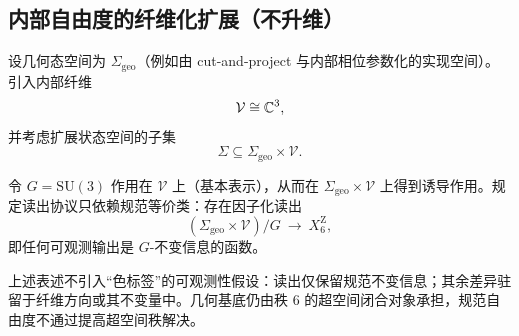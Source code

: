 \subsection{内部自由度的纤维化扩展（不升维）}
\begin{definition}[状态空间的纤维化扩展]\label{def:sigma-geo-times-V}
设几何态空间为 $\Sigma_{\mathrm{geo}}$（例如由 cut-and-project 与内部相位参数化的实现空间）。引入内部纤维
$$
\mathcal{V}\cong \mathbb{C}^{3},
$$
并考虑扩展状态空间的子集
$$
\Sigma\subseteq \Sigma_{\mathrm{geo}}\times \mathcal{V}.
$$
\end{definition}\begin{definition}[规范等价类与读出因子化]\label{def:gauge-quotient-readout}
令 $G=\mathrm{SU}(3)$ 作用在 $\mathcal{V}$ 上（基本表示），从而在 $\Sigma_{\mathrm{geo}}\times\mathcal{V}$ 上得到诱导作用。规定读出协议只依赖规范等价类：存在因子化读出
$$
(\Sigma_{\mathrm{geo}}\times\mathcal{V})/G \ \longrightarrow\ X_6^{\mathrm Z},
$$
即任何可观测输出是 $G$-不变信息的函数。
\end{definition}\begin{remark}
上述表述不引入“色标签”的可观测性假设：读出仅保留规范不变信息；其余差异驻留于纤维方向或其不变量中。几何基底仍由秩 $6$ 的超空间闭合对象承担，规范自由度不通过提高超空间秩解决。
\end{remark}